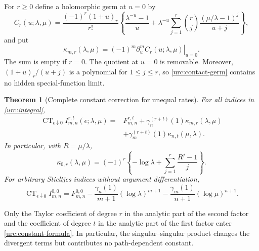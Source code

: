 \documentclass[11pt,a4paper]{article}
\newtheorem{theorem}{Theorem}[section]
\theoremstyle{definition}
\theoremstyle{remark}
\numberwithin{equation}{section}
\begin{document}
For $r\ge0$ define a holomorphic germ at $u=0$ by
\begin{equation}\label{urc:contact-germ}
 C_r(u;\lambda,\mu)=\frac{(-1)^r(1+u)_r}{r!}
 \left\{\frac{\lambda^{-u}-1}{u}
 +\lambda^{-u}\sum_{j=1}^r
    \binom rj\frac{(\mu/\lambda-1)^j}{u+j}\right\},
\end{equation}
and put
\begin{equation}\label{urc:kappa}
 \kappa_{m,r}(\lambda,\mu)
 =(-1)^m\left.\partial_u^m C_r(u;\lambda,\mu)\right|_{u=0}.
\end{equation}
The sum is empty if $r=0$. The quotient at $u=0$ is removable.
Moreover, $(1+u)_r/(u+j)$ is a polynomial for $1\le j\le r$,
so \eqref{urc:contact-germ} contains no hidden special-function limit.

\begin{theorem}[Complete constant correction for unequal rates]
\label{urc:constant-theorem}
For all indices in \eqref{urc:integral},
\begin{equation}\label{urc:constant-formula}
 \boxed{\begin{aligned}
 \operatorname{CT}_{\epsilon\downarrow0}
       I_{m,n}^{r,t}(\epsilon;\lambda,\mu)
 ={}&F_{m,n}^{r,t}
    +\gamma_n^{(r+t)}(1)\kappa_{m,r}(\lambda,\mu)\\
   &+\gamma_m^{(r+t)}(1)\kappa_{n,t}(\mu,\lambda).
 \end{aligned}}
\end{equation}
In particular, with $R=\mu/\lambda$,
\begin{equation}\label{urc:zeroth-contact}
 \boxed{\displaystyle
 \kappa_{0,r}(\lambda,\mu)
 =(-1)^r\left\{-\log\lambda+
                   \sum_{j=1}^r\frac{R^j-1}{j}\right\}.}
\end{equation}
For arbitrary Stieltjes indices without argument differentiation,
\begin{equation}\label{urc:no-argument-derivatives}
 \operatorname{CT}_{\epsilon\downarrow0}I_{m,n}^{0,0}
 =F_{m,n}^{0,0}
  -\frac{\gamma_n(1)}{m+1}(\log\lambda)^{m+1}
  -\frac{\gamma_m(1)}{n+1}(\log\mu)^{n+1}.
\end{equation}
\end{theorem}

Only the Taylor coefficient of degree $r$ in the analytic part of
the second factor and the coefficient of degree $t$ in the analytic
part of the first factor enter \eqref{urc:constant-formula}. In
particular, the singular--singular product changes the divergent
terms but contributes no path-dependent constant.
\end{document}
